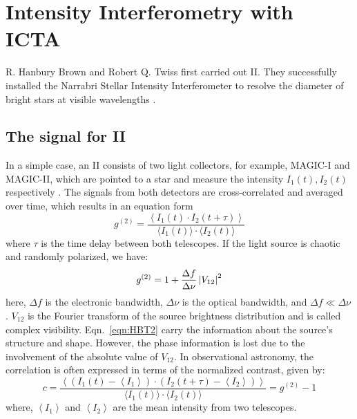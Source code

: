 \section{Intensity Interferometry with ICTA}
R. Hanbury Brown and Robert Q. Twiss first carried out II. They successfully installed the Narrabri Stellar Intensity Interferometer to resolve the diameter of bright stars at visible wavelengths \citep{brown1954lxxiv, brown1974intensity}.
\subsection{The signal for II}\label{sec:signal}
In a simple case, an II consists of two light collectors, for example, MAGIC-I and MAGIC-II, which are pointed to a star and measure the intensity $I_1(t), I_2(t)$ respectively \citep{acciari2020optical, dravins2013optical}. The signals from both detectors are cross-correlated and averaged over time, which results in an equation form
\begin{equation}
	g^{(2)} = \frac{\left\langle I_1(t) \cdot I_2(t + \tau) \right\rangle}{\langle I_1(t) \rangle \cdot \langle I_2(t) \rangle} 
	\label{eqn:HBT}
\end{equation}
where $\tau$ is the time delay between both telescopes. If the light source is chaotic and randomly polarized, we have:
\begin{equation}
	g^{(2)} = 1 + \frac{\Delta f}{\Delta \nu} \left|V_{12}\right|^2
	\label{eqn:HBT2}
\end{equation}
here, $\Delta f$ is the electronic bandwidth, $\Delta \nu$ is the optical bandwidth, and $\Delta f \ll \Delta \nu$ \cite{acciari2020optical}. $V_{12}$ is the Fourier transform of the source brightness distribution and is called complex visibility. Eqn.~\ref{eqn:HBT2} carry the information about the source's structure and shape. However, the phase information is lost due to the involvement of the absolute value of $V_{12}$. In observational astronomy, the correlation is often expressed in terms of the normalized contrast, given by:
\begin{equation}
	c = \frac{\left\langle \left( I_1(t) - \left\langle I_1 \right\rangle \right) \cdot \left( I_2(t + \tau) - \left\langle I_2 \right\rangle \right) \right\rangle}{\langle I_1(t) \rangle \cdot \langle I_2(t) \rangle} = g^{(2)} - 1
\end{equation}
where, $\left\langle I_1 \right\rangle$ and $\left\langle I_2 \right\rangle$ are the mean intensity from two telescopes.

